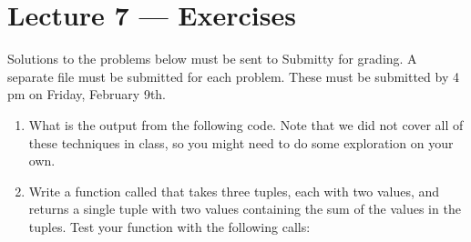 \documentclass[letterpaper,10pt,english]{sphinxmanual}
\begin{document}
\chapter{Lecture 7 — Exercises}
\label{\detokenize{lecture_notes/lec07_modules_images_exercises/exercises:lecture-7-exercises}}\label{\detokenize{lecture_notes/lec07_modules_images_exercises/exercises::doc}}
Solutions to the problems below must be sent to Submitty for grading.
A separate file must be submitted for each problem.  These must be
submitted by 4 pm on Friday, February 9th.
\begin{enumerate}
\item {} 
What is the output from the following code.  Note that we did not
cover all of these techniques in class, so you might need to do
some exploration on your own.

%
\begin{sphinxVerbatim}[commandchars=\\\{\}]
   
     \PYG{p}{[}\PYG{p}{]}  \PYG{p}{[}\PYG{p}{]}
         \PYG{p}{[}\PYG{p}{]} \PYG{p}{[}\PYG{p}{]}
         

   
    
    
 \PYG{p}{[}\PYG{p}{]}  \PYG{p}{[}\PYG{p}{]} 
  
 \PYG{p}{[}\PYG{p}{]}  \PYG{p}{[}\PYG{p}{]} 
  
     
\end{sphinxVerbatim}

\item {} 
Write a function called  that takes three tuples,
each with two values, and returns a single tuple with two values
containing the sum of the values in the tuples.  Test your function
with the following calls:


\end{enumerate}
\end{document}
